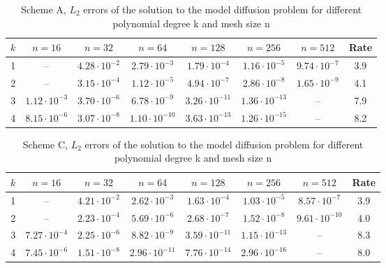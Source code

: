 \renewcommand{\arraystretch}{1.2}

\begin{table} 
\begin{center}
\begin{tabular}{ c | c  c  c  c  c  c | c }
	\hline
	$k$ & $n = 16$ & $n = 32$ & $n = 64$ & $n = 128$ & $n = 256$ & $n = 512$ & Rate \\
	\hline
	1 & -- & $4.28 \cdot 10^{-2}$ & $2.79 \cdot 10^{-3}$ & $1.79 \cdot 10^{-4} $ &  $1.16 \cdot 10^{-5}$  & $ 9.74 \cdot 10^{-7} $ & 3.9  \\
	2 & -- & $3.15 \cdot 10^{-4}$ & $1.12 \cdot 10^{-5}$ & $4.94 \cdot 10^{-7} $ &  $2.86 \cdot 10^{-8}$  & $ 1.65 \cdot 10^{-9} $ & 4.1 \\
	3 & $1.12 \cdot 10^{-3}$ & $3.70 \cdot 10^{-6}$ & $6.78 \cdot 10^{-9} $ &  $3.26 \cdot 10^{-11}$  & $ 1.36 \cdot 10^{-13} $ & -- & 7.9\\
	4 & $8.15 \cdot 10^{-6}$ & $3.07 \cdot 10^{-8}$ & $1.10 \cdot 10^{-10} $ &  $3.63 \cdot 10^{-13}$  & $ 1.26 \cdot 10^{-15} $ & -- & 8.2\\
	\hline
\end{tabular}
\caption{Scheme A, $L_{2}$ errors of the solution to the model diffusion problem for different polynomial degree k and mesh size n}
\label{table:scheme_a}
\end{center}
\end{table}

\begin{table} 
\begin{center}
\begin{tabular}{ c | c  c  c  c  c  c | c }
	\hline
	$k$ & $n = 16$ & $n = 32$ & $n = 64$ & $n = 128$ & $n = 256$ & $n = 512$ & Rate \\
	\hline
	1 & -- & $4.21 \cdot 10^{-2}$ & $2.62 \cdot 10^{-3}$ & $1.63 \cdot 10^{-4} $ &  $1.03 \cdot 10^{-5}$  & $ 8.57 \cdot 10^{-7} $ & 3.9  \\
	2 & -- & $2.23 \cdot 10^{-4}$ & $5.69 \cdot 10^{-6}$ & $2.68 \cdot 10^{-7} $ &  $1.52 \cdot 10^{-8}$  & $ 9.61 \cdot 10^{-10} $ & 4.0 \\
	3 & $7.27 \cdot 10^{-4}$ & $2.25 \cdot 10^{-6}$ & $8.82 \cdot 10^{-9} $ &  $3.59 \cdot 10^{-11}$  & $ 1.15 \cdot 10^{-13} $ & -- & 8.3\\
	4 & $7.45 \cdot 10^{-6}$ & $1.51 \cdot 10^{-8}$ & $2.96 \cdot 10^{-11} $ &  $7.76 \cdot 10^{-14}$  & $ 2.96 \cdot 10^{-16} $ & -- & 8.0\\
	\hline
\end{tabular}
\caption{Scheme C, $L_{2}$ errors of the solution to the model diffusion problem for different polynomial degree k and mesh size n}
\label{table:scheme_c}
\end{center}
\end{table}

